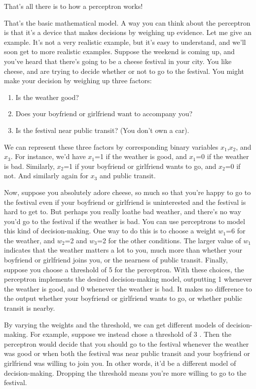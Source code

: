 That's all there is to how a perceptron works!

That's the basic mathematical model. A way you can think about the perceptron is that it's a device that makes decisions by weighing up evidence. Let me give an example. It's not a very realistic example, but it's easy to understand, and we'll soon get to more realistic examples. Suppose the weekend is coming up, and you've heard that there's going to be a cheese festival in your city. You like cheese, and are trying to decide whether or not to go to the festival. You might make your decision by weighing up three factors: 
\begin{enumerate}
\item Is the weather good? 
\item  Does your boyfriend or girlfriend want to accompany you? 
\item Is the festival near public transit? (You don't own a car). 
\end{enumerate}
We can represent these three factors by corresponding binary variables $x_1$,$x_2$, and $x_3$. For instance, we'd have $x_1$=1 if the weather is good, and $x_1$=0 if the weather is bad. Similarly, $x_2$=1 if your boyfriend or girlfriend wants to go, and $x_2$=0 if not. And similarly again for $x_3$ and public transit.

Now, suppose you absolutely adore cheese, so much so that you're happy to go to the festival even if your boyfriend or girlfriend is uninterested and the festival is hard to get to. But perhaps you really loathe bad weather, and there's no way you'd go to the festival if the weather is bad. You can use perceptrons to model this kind of decision-making. One way to do this is to choose a weight $w_1$=6 for the weather, and $w_2$=2 and $w_3$=2 for the other conditions. The larger value of $w_1$ indicates that the weather matters a lot to you, much more than whether your boyfriend or girlfriend joins you, or the nearness of public transit. Finally, suppose you choose a threshold of 5 for the perceptron. With these choices, the perceptron implements the desired decision-making model, outputting 1 whenever the weather is good, and 0 whenever the weather is bad. It makes no difference to the output whether your boyfriend or girlfriend wants to go, or whether public transit is nearby.

By varying the weights and the threshold, we can get different models of decision-making. For example, suppose we instead chose a threshold of 3 . Then the perceptron would decide that you should go to the festival whenever the weather was good or when both the festival was near public transit and your boyfriend or girlfriend was willing to join you. In other words, it'd be a different model of decision-making. Dropping the threshold means you're more willing to go to the festival.

